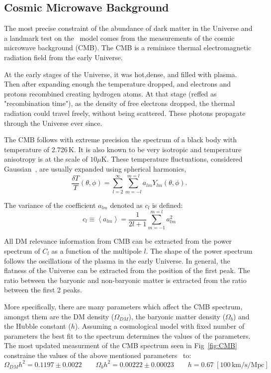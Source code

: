 \subsection{Cosmic Microwave Background}
The most precise constraint of the abundance of dark matter in the Universe and a landmark test on the \cdm\ model comes from the measurements of the cosmic microwave background (CMB). The CMB is a reminisce thermal electromagnetic radiation field from the early Universe. 

At the early stages of the Universe, it was hot,dense, and filled with plasma. Then after expanding enough the temperature dropped, and electrons and protons  recombined creating hydrogen atoms. At that stage (reffed as "recombination time"), as the density of free electrons dropped, the thermal radiation could travel freely, without being scattered. These photons propagate through the Universe ever since.       

The CMB follows with extreme precision the spectrum of a black body with temperature of 2.726\,K. It is also known to be very isotropic and temperature  anisotropy is at the scale of $10\mu$K. These temperature fluctuations, considered Gaussian~\cite{WMAP:9years}, are usually expanded using spherical harmonics,
\begin{equation}
\frac{\delta T }{T}(\theta,\phi) = \sum_{l=2}^{\infty}\sum_{m=-l}^{m=l}a_{lm}Y_{lm}(\theta,\phi). 
\end{equation} 

The variance of the coefficient $a_{lm}$ denoted as $c_l$ is defined:
\begin{equation}
c_l \equiv \left< a_{lm} \right> = \frac{1}{2l+1}\sum_{m=-1}^{m=l}a_{lm}^2
\end{equation}

All DM relevance information from CMB can be extracted from the power spectrum of $C_l$ as a function of the multipole $l$. The shape of the power spectrum follows the oscillations of the plasma in the early Universe. In general, the flatness of the Universe can be extracted from the position of the first peak. The ratio between the baryonic and non-baryonic matter is extracted from the ratio between the first 2 peaks.   

More specifically, there are many parameters which affect the CMB spectrum, amongst them are the DM density ($\Omega_{DM}$), the baryonic matter density ($\Omega_{b}$) and the Hubble constant ($h$). Assuming a cosmological model with fixed number of parameters the best fit to the spectrum determines the values of the parameters. The most updated measurment of the CMB spectrum seen in Fig~\ref{fig:CMB} constraine the values of the above mentioned parameters~\cite{Planck} to:
\begin{equation}
\Omega_{DM}h^2 = 0.1197 \pm 0.0022 \qquad \Omega_{b}h^2 = 0.00222 \pm 0.00023 \qquad h=0.67\;[100\, \mathrm{km/s/Mpc}] 
\end{equation}

